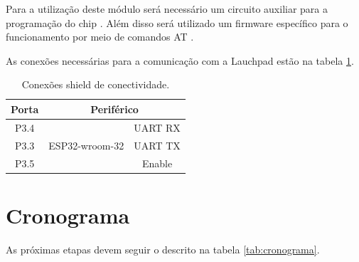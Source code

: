 Para a utilização deste módulo será necessário um circuito auxiliar para a programação do chip \cite{Systems2019}. Além disso será utilizado um firmware específico para o funcionamento por meio de comandos AT \cite{Systems2018}.

As conexões necessárias para a comunicação com a Lauchpad estão na tabela \ref{tab:conect}.

\begin{table}[h!]
\centering
\begin{tabular}{|c|c|c|}
\hline
Porta & \multicolumn{2}{c|}{Periférico}           \\ \hline
P3.4  & \multirow{3}{*}{ESP32-wroom-32} & UART RX \\ \cline{1-1} \cline{3-3} 
P3.3  &                                 & UART TX \\ \cline{1-1} \cline{3-3} 
P3.5  &                                 & Enable  \\ \hline
\end{tabular}
\caption{Conexões shield de conectividade.}
\label{tab:conect}
\end{table}

\section{Cronograma}

As próximas etapas devem seguir o descrito na tabela \ref{tab:cronograma}.


